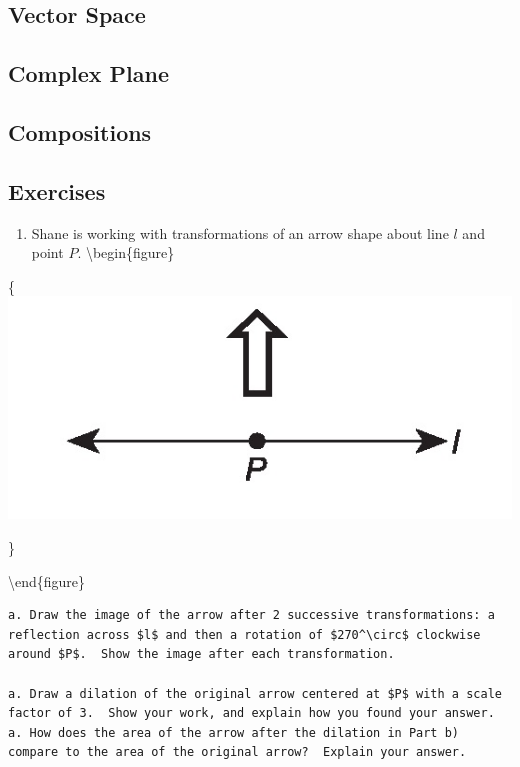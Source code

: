 \documentclass[
]{book}
\providecommand{\tightlist}{%
  \setlength{\itemsep}{0pt}\setlength{\parskip}{0pt}}
\theoremstyle{definition}
\theoremstyle{definition}
\theoremstyle{definition}
\theoremstyle{definition}
\theoremstyle{remark}
\begin{document}
\hypertarget{vector-space-1}{%
\subsection{Vector Space}\label{vector-space-1}}

\hypertarget{complex-plane-5}{%
\subsection{Complex Plane}\label{complex-plane-5}}

\hypertarget{compositions-2}{%
\subsection{Compositions}\label{compositions-2}}

\hypertarget{exercises-58}{%
\subsection{Exercises}\label{exercises-58}}

\begin{enumerate}
\def\labelenumi{\arabic{enumi}.}
\tightlist
\item
  Shane is working with transformations of an arrow shape about line \(l\) and point \(P\).
  \textbackslash begin\{figure\}
\end{enumerate}

\{\centering \includegraphics[width=0.35\linewidth]{images/uparrow}

\}

\textbackslash end\{figure\}

\begin{verbatim}
a. Draw the image of the arrow after 2 successive transformations: a reflection across $l$ and then a rotation of $270^\circ$ clockwise around $P$.  Show the image after each transformation.

a. Draw a dilation of the original arrow centered at $P$ with a scale factor of 3.  Show your work, and explain how you found your answer.
a. How does the area of the arrow after the dilation in Part b) compare to the area of the original arrow?  Explain your answer.
\end{verbatim}
\end{document}

